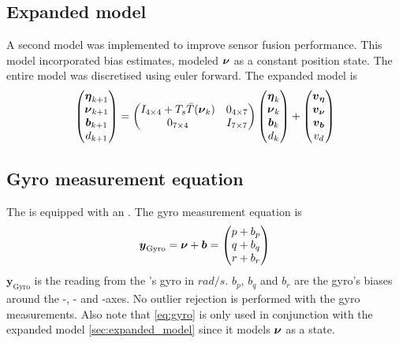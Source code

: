 \subsection{Expanded model}\label{sec:expanded_model}
A second model was implemented to improve sensor fusion performance. This model incorporated bias estimates, modeled $\boldsymbol{\nu}$ as a constant position state. The entire model was discretised using euler forward. The expanded model is 
\begin{equation}\label{eq:expanded_model}
\begin{pmatrix}
\boldsymbol{\eta}_{k+1}\\
\boldsymbol{\nu}_{k+1}\\
\boldsymbol{b}_{k+1}\\
d_{k+1}
\end{pmatrix}=
\begin{pmatrix}
I_{4\times4} + T_s \bar{T}(\boldsymbol{\nu}_{k})& 0_{4\times7}\\
0_{7\times4} & I_{7\times7}\\
\end{pmatrix}
\begin{pmatrix}
\boldsymbol{\eta}_{k}\\
\boldsymbol{\nu}_{k}\\
\boldsymbol{b}_{k}\\
d_{k}
\end{pmatrix}
+\begin{pmatrix}
  \boldsymbol{v}_{\boldsymbol{\eta}}\\
  \boldsymbol{v}_{\boldsymbol{\nu}}\\
  \boldsymbol{v}_{\boldsymbol{b}}\\
  v_d 
\end{pmatrix}
\end{equation}

\subsection{Gyro measurement equation}
The \abbrROV is equipped with an \abbrIMU. The gyro measurement equation is 
\begin{equation}\label{eq:gyro}
\boldsymbol{y}_\text{Gyro}= \boldsymbol{\nu} + \boldsymbol{b} =
 \begin{pmatrix}
p + b_p\\
q + b_q\\
r + b_r
\end{pmatrix}
\end{equation}
 $\boldsymbol{y}_\text{Gyro}$ is the reading from the \abbrIMU's gyro in $rad/s$. $b_p$, $b_q$ and $b_r$ are the gyro's biases around the \xPosition-, \yPosition- and \zPosition-axes. No outlier rejection is performed with the gyro measurements. Also note that \eqref{eq:gyro} is only used in conjunction with the expanded model \eqref{sec:expanded_model} since it models $\boldsymbol{\nu}$ as a state. 

